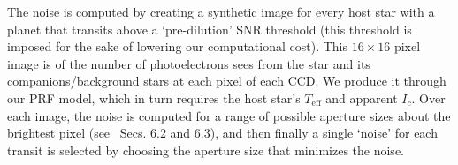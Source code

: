 \begin{itemize}
	The noise is computed by creating a synthetic image for every
        host star with a planet that transits above a `pre-dilution'
        SNR threshold (this threshold is imposed for the sake of
        lowering our computational cost).  This $16\times16$ pixel
        image is of the number of photoelectrons \tess sees from the
        star and its companions/background stars at each pixel of each
        CCD.  We produce it through our PRF model, which in turn
        requires the host star's $T_\mathrm{eff}$ and apparent $I_c$.
        Over each image, the noise is computed for a range of possible
        aperture sizes about the brightest pixel
        (see~ Secs. 6.2 and 6.3), and then
        finally a single `noise' for each transit is selected by
        choosing the aperture size that minimizes the noise.

\end{itemize}
